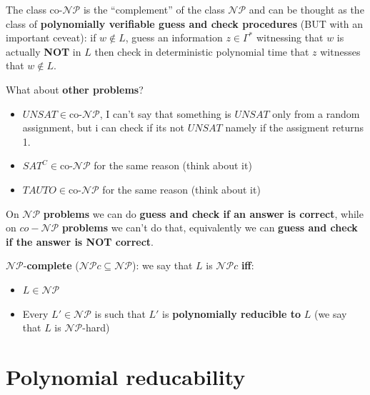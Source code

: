 	\begin{definition} The class co-$\mathcal{NP}$ is the ``complement'' of the class $\mathcal{NP}$ and can be thought as the class of \textbf{polynomially verifiable guess and check procedures} (BUT with an important ceveat): if $w \notin L$, guess an information $z \in \Gamma^\ast$ witnessing that $w$ is actually \textbf{NOT} in $L$ then check in deterministic polynomial time that $z$ witnesses that $w \notin L$.
	\end{definition}

	\noindent
	What about \textbf{other problems}?

	\begin{itemize}
	  \item $UNSAT \in \text{co-}\mathcal{NP}$, I can't say that something is $UNSAT$ only from a random assignment, but i can check if its not $UNSAT$ namely if the assigment returns 1.
	  \item $SAT^C \in \text{co-}\mathcal{NP}$ for the same reason (think about it)
	  \item $TAUTO \in \text{co-}\mathcal{NP}$ for the same reason (think about it)
	\end{itemize}

	On $\mathcal{NP}$ \textbf{problems} we can do \textbf{guess and check if an answer is correct}, while on $co-\mathcal{NP}$ \textbf{problems} we can't do that, equivalently we can \textbf{guess and check if the answer is NOT correct}.

	\begin{definition} $\mathcal{NP}$-\textbf{complete} ($\mathcal{NP}c \subseteq \mathcal{NP}$): we say that $L$ is $\mathcal{NP}c$ \textbf{iff}:
	\begin{itemize}
		\item $L \in \mathcal{NP}$
		\item Every $L' \in \mathcal{NP}$ is such that $L'$ is \textbf{polynomially reducible to} $L$ (we say that $L$ is $\mathcal{NP}$-hard)
	\end{itemize}
	\end{definition}

	\section{Polynomial reducability}

